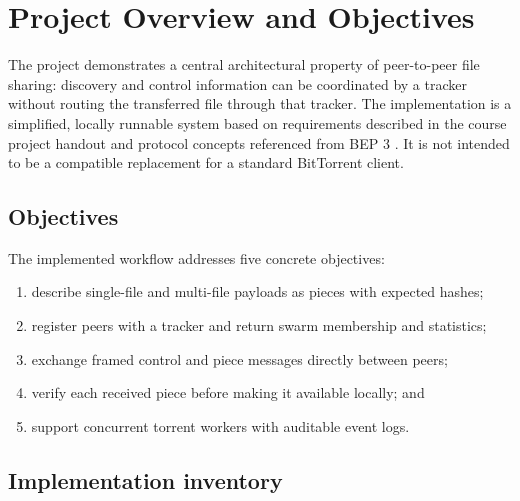 \section{Project Overview and Objectives}
\label{sec:overview}

The project demonstrates a central architectural property of peer-to-peer file sharing: discovery and control information can be coordinated by a tracker without routing the transferred file through that tracker. The implementation is a simplified, locally runnable system based on requirements described in the course project handout \citep{courseBrief} and protocol concepts referenced from BEP 3 \citep{bep3}. It is not intended to be a compatible replacement for a standard BitTorrent client.

\subsection{Objectives}

The implemented workflow addresses five concrete objectives:

\begin{enumerate}
  \item describe single-file and multi-file payloads as pieces with expected hashes;
  \item register peers with a tracker and return swarm membership and statistics;
  \item exchange framed control and piece messages directly between peers;
  \item verify each received piece before making it available locally; and
  \item support concurrent torrent workers with auditable event logs.
\end{enumerate}

\subsection{Implementation inventory}

